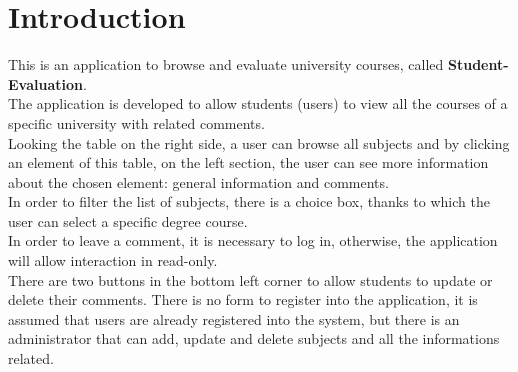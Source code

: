 \documentclass[a4paper]{article}
\begin{document}
\baselineskip 13pt
	
\begin{frontespizio} 
 \Preambolo{\renewcommand{\frontpretitlefont}{\fontsize{15}{12}\scshape}}
\Rientro {1cm}
 \Punteggiatura {}
\end{frontespizio}


\tableofcontents\thispagestyle{empty}
\clearpage


\section{Introduction}
This is an application to browse and evaluate university courses, called \textbf{Student-Evaluation}.\\
The application is developed to allow students (users) to view all the courses of a specific university with related comments.\\ 
Looking the table on the right side, a user can browse all subjects and by clicking an element of this table, on the left section, the user can see more information about the chosen element: general information and comments.\\ 
In order to filter the list of subjects, there is a choice box, thanks to which the user can select a specific degree course. \\
In order to leave a comment, it is necessary to log in, otherwise, the application will allow interaction in read-only.\\
There are two buttons in the bottom left corner to allow students to update or delete their comments.
There is no form to register into the application, it is assumed that users are already registered into the system, but there is an administrator that can add, update and delete subjects and all the informations related.
\end{document}
